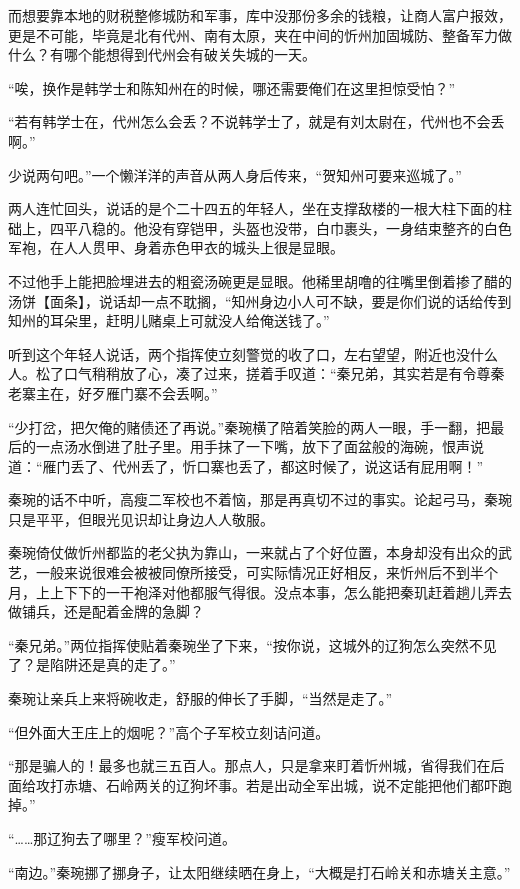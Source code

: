 而想要靠本地的财税整修城防和军事，库中没那份多余的钱粮，让商人富户报效，更是不可能，毕竟是北有代州、南有太原，夹在中间的忻州加固城防、整备军力做什么？有哪个能想得到代州会有破关失城的一天。

“唉，换作是韩学士和陈知州在的时候，哪还需要俺们在这里担惊受怕？”

“若有韩学士在，代州怎么会丢？不说韩学士了，就是有刘太尉在，代州也不会丢啊。”

少说两句吧。”一个懒洋洋的声音从两人身后传来，“贺知州可要来巡城了。”

两人连忙回头，说话的是个二十四五的年轻人，坐在支撑敌楼的一根大柱下面的柱础上，四平八稳的。他没有穿铠甲，头盔也没带，白巾裹头，一身结束整齐的白色军袍，在人人贯甲、身着赤色甲衣的城头上很是显眼。

不过他手上能把脸埋进去的粗瓷汤碗更是显眼。他稀里胡噜的往嘴里倒着掺了醋的汤饼【面条】，说话却一点不耽搁，“知州身边小人可不缺，要是你们说的话给传到知州的耳朵里，赶明儿赌桌上可就没人给俺送钱了。”

听到这个年轻人说话，两个指挥使立刻警觉的收了口，左右望望，附近也没什么人。松了口气稍稍放了心，凑了过来，搓着手叹道：“秦兄弟，其实若是有令尊秦老寨主在，好歹雁门寨不会丢啊。”

“少打岔，把欠俺的赌债还了再说。”秦琬横了陪着笑脸的两人一眼，手一翻，把最后的一点汤水倒进了肚子里。用手抹了一下嘴，放下了面盆般的海碗，恨声说道：“雁门丢了、代州丢了，忻口寨也丢了，都这时候了，说这话有屁用啊！”

秦琬的话不中听，高瘦二军校也不着恼，那是再真切不过的事实。论起弓马，秦琬只是平平，但眼光见识却让身边人人敬服。

秦琬倚仗做忻州都监的老父执为靠山，一来就占了个好位置，本身却没有出众的武艺，一般来说很难会被被同僚所接受，可实际情况正好相反，来忻州后不到半个月，上上下下的一干袍泽对他都服气得很。没点本事，怎么能把秦玑赶着趟儿弄去做铺兵，还是配着金牌的急脚？

“秦兄弟。”两位指挥使贴着秦琬坐了下来，“按你说，这城外的辽狗怎么突然不见了？是陷阱还是真的走了。”

秦琬让亲兵上来将碗收走，舒服的伸长了手脚，“当然是走了。”

“但外面大王庄上的烟呢？”高个子军校立刻诘问道。

“那是骗人的！最多也就三五百人。那点人，只是拿来盯着忻州城，省得我们在后面给攻打赤塘、石岭两关的辽狗坏事。若是出动全军出城，说不定能把他们都吓跑掉。”

“……那辽狗去了哪里？”瘦军校问道。

“南边。”秦琬挪了挪身子，让太阳继续晒在身上，“大概是打石岭关和赤塘关主意。”


